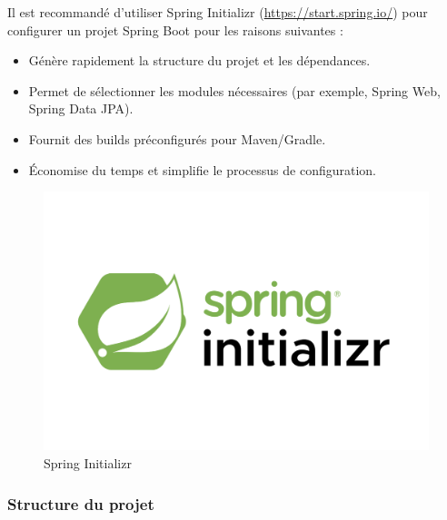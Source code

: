\documentclass{article}
\begin{document}
Il est recommandé d'utiliser Spring Initializr (\href{https://start.spring.io/}{https://start.spring.io/}) pour configurer un projet Spring Boot pour les raisons suivantes :
\begin{itemize}
    \item Génère rapidement la structure du projet et les dépendances.
    \item Permet de sélectionner les modules nécessaires (par exemple, Spring Web, Spring Data JPA).
    \item Fournit des builds préconfigurés pour Maven/Gradle.
    \item Économise du temps et simplifie le processus de configuration.
\end{itemize}

\begin{figure}[H]
    \centering
    \begin{framed}
        \includegraphics[width=0.6\linewidth]{images/spring_init.png}
    \end{framed}
    \caption{Spring Initializr}
    \label{fig:spring-ioc-container}
\end{figure}

\subsubsection{Structure du projet}

\end{document}
